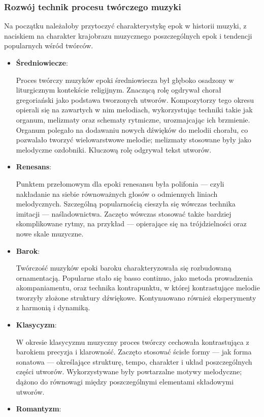 \subsubsection{Rozwój technik procesu twórczego muzyki}
Na początku należałoby przytoczyć charakterystykę epok w historii muzyki, z naciskiem na charakter krajobrazu muzycznego
poszczególnych epok i tendencji popularnych wśród twórców.
\begin{itemize}
	\item \textbf{Średniowiecze}:

	      Proces twórczy muzyków epoki średniowiecza był głęboko osadzony w liturgicznym kontekście religijnym.
	      Znaczącą rolę ogdrywał chorał gregoriański jako podstawa tworzonych utworów.
	      Kompozytorzy tego okresu opierali się na zawartych w nim melodiach, wykorzystując techniki takie jak organum,
	      melizmaty oraz schematy rytmiczne, urozmajcając ich brzmienie.
	      Organum polegało na dodawaniu nowych dźwięków do melodii chorału, co pozwalało tworzyć wielowarstwowe melodie;
	      melizmaty stosowane były jako melodyczne ozdobniki. Kluczową rolę odgrywał tekst utworów.
	\item \textbf{Renesans}:

	      Punktem przełomowym dla epoki renesansu była polifonia — czyli nakładanie na siebie równoważnych głosów o
	      odmiennych liniach melodycznych.
	      Szczególną popularnością cieszyła się wówczas technika imitacji — naśladownictwa.
	      Zaczęto wówczas stosować także bardziej skomplikowane rytmy, na przykład — opierające się na trójdzielności
	      oraz nowe skale muzyczne.
	\item \textbf{Barok}:

	      Twórczość muzyków epoki baroku charakteryzowała się rozbudowaną ornamentacją.
	      Popularne stało się basso continuo, jako metoda prowadzenia akompaniamentu, oraz technika kontrapunktu,
	      w której kontrastujące melodie tworzyły złożone struktury dźwiękowe.
	      Kontynuowano również eksperymenty z harmonią i dynamiką.
	\item \textbf{Klasycyzm}:

	      W okresie klasycyzmu muzyczny proces twórczy cechowała kontrastująca z barokiem precyzja i klarowność.
	      Zaczęto stosować ścisłe formy — jak forma sonatowa — określające strukturę, tempo,
	      charakter i układ poszczególnych części utworów.
	      Wykorzystywane były powtarzalne motywy melodyczne; dążono do równowagi między poszczególnymi elementami składowymi utworów.
	\item \textbf{Romantyzm}:


\end{itemize}
